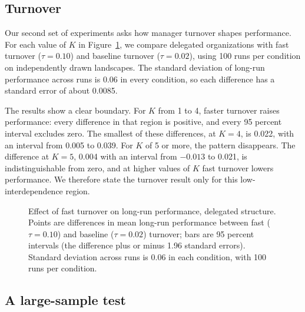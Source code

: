 \documentclass[11pt]{article}
\begin{document}
\subsection{Turnover}

Our second set of experiments asks how manager turnover shapes performance. For each value of $K$ in Figure~\ref{fig:turnover}, we compare delegated organizations with fast turnover ($\tau = 0.10$) and baseline turnover ($\tau = 0.02$), using 100 runs per condition on independently drawn landscapes. The standard deviation of long-run performance across runs is 0.06 in every condition, so each difference has a standard error of about 0.0085.

The results show a clear boundary. For $K$ from 1 to 4, faster turnover raises performance: every difference in that region is positive, and every 95 percent interval excludes zero. The smallest of these differences, at $K = 4$, is 0.022, with an interval from 0.005 to 0.039. For $K$ of 5 or more, the pattern disappears. The difference at $K = 5$, 0.004 with an interval from $-0.013$ to 0.021, is indistinguishable from zero, and at higher values of $K$ fast turnover lowers performance. We therefore state the turnover result only for this low-interdependence region.

\begin{figure}[h]
\centering
{}
\caption{Effect of fast turnover on long-run performance, delegated structure. Points are differences in mean long-run performance between fast ($\tau = 0.10$) and baseline ($\tau = 0.02$) turnover; bars are 95 percent intervals (the difference plus or minus 1.96 standard errors). Standard deviation across runs is 0.06 in each condition, with 100 runs per condition.}
\label{fig:turnover}
\end{figure}

\subsection{A large-sample test}
\end{document}
